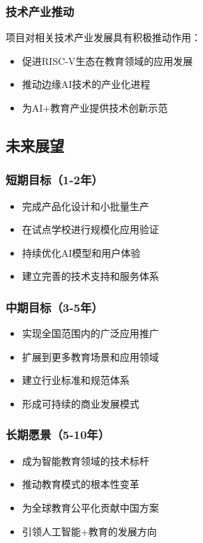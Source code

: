 \documentclass[12pt,a4paper]{article}
\begin{document}
\subsubsection{技术产业推动}
项目对相关技术产业发展具有积极推动作用：
\begin{itemize}[leftmargin=2em]
    \item 促进RISC-V生态在教育领域的应用发展
    \item 推动边缘AI技术的产业化进程
    \item 为AI+教育产业提供技术创新示范
\end{itemize}

\subsection{未来展望}

\subsubsection{短期目标（1-2年）}
\begin{itemize}[leftmargin=2em]
    \item 完成产品化设计和小批量生产
    \item 在试点学校进行规模化应用验证
    \item 持续优化AI模型和用户体验
    \item 建立完善的技术支持和服务体系
\end{itemize}

\subsubsection{中期目标（3-5年）}
\begin{itemize}[leftmargin=2em]
    \item 实现全国范围内的广泛应用推广
    \item 扩展到更多教育场景和应用领域
    \item 建立行业标准和规范体系
    \item 形成可持续的商业发展模式
\end{itemize}

\subsubsection{长期愿景（5-10年）}
\begin{itemize}[leftmargin=2em]
    \item 成为智能教育领域的技术标杆
    \item 推动教育模式的根本性变革
    \item 为全球教育公平化贡献中国方案
    \item 引领人工智能+教育的发展方向
\end{itemize}
\end{document}
